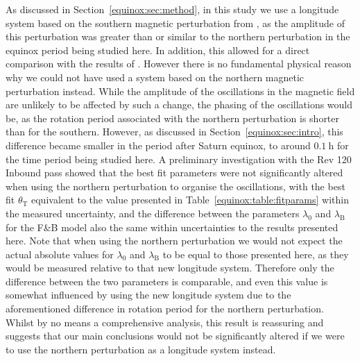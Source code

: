 As discussed in Section~\ref{equinox:sec:method}, in this study we use a longitude system based on the southern magnetic perturbation from \citet{andrews2012}, as the amplitude of this perturbation was greater than or similar to the northern perturbation in the equinox period being studied here. In addition, this allowed for a direct comparison with the results of \citet{arridge2011}. However there is no fundamental physical reason why we could not have used a system based on the northern magnetic perturbation instead. While the amplitude of the oscillations in the magnetic field are unlikely to be affected by such a change, the phasing of the oscillations would be, as the rotation period associated with the northern perturbation is shorter than for the southern. However, as discussed in Section~\ref{equinox:sec:intro}, this difference became smaller in the period after Saturn equinox, to around $\SI{0.1}{\hour}$ for the time period being studied here. A preliminary investigation with the Rev 120 Inbound pass showed that the best fit parameters were not significantly altered when using the northern perturbation to organise the oscillations, with the best fit $\theta_\mathrm{T}$ equivalent to the value presented in Table~\ref{equinox:table:fitparams} within the measured uncertainty, and the difference between the parameters $\lambda_0$ and $\lambda_\mathrm{B}$ for the F{\&}B model also the same within uncertainties to the results presented here. Note that when using the northern perturbation we would not expect the actual absolute values for $\lambda_0$ and $\lambda_\mathrm{B}$ to be equal to those presented here, as they would be measured relative to that new longitude system. Therefore only the difference between the two parameters is comparable, and even this value is somewhat influenced by using the new longitude system due to the aforementioned difference in rotation period for the northern perturbation. Whilst by no means a comprehensive analysis, this result is reassuring and suggests that our main conclusions would not be significantly altered if we were to use the northern perturbation as a longitude system instead.

